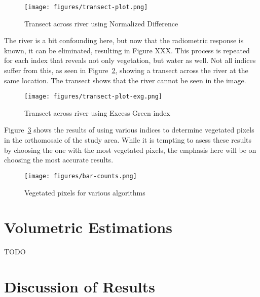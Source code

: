 \documentclass[letterpaper]{article}
\begin{document}
{\begin{figure}[H]
\centering
  	\texttt{[image: figures/transect-plot.png]}
  	\label{fig:exgexr}
  \caption{Transect across river using Normalized Difference}
    \label{fig:transect-plot} 
\end{figure}

The river is a bit confounding here, but now that the radiometric response is known, it can be eliminated, resulting in Figure XXX.  This process is repeated for each index that reveals not only vegetation, but water as well. Not all indices suffer from this, as seen in Figure~\ref{fig:transect-plot-exg}, showing a transect across the river at the same location.  The transect shows that the river cannot be seen in the image.

\begin{figure}[H]
\centering
  \texttt{[image: figures/transect-plot-exg.png]}
  \caption{Transect across river using Excess Green index}
  \label{fig:transect-plot-exg} 
\end{figure}

Figure~\ref{fig:barcount} shows the results of using various indices to determine vegetated pixels in the orthomosaic of the study area.  While it is tempting to asess these results by choosing the one with the most vegetated pixels, the emphasis here will be on choosing the most accurate results.

\begin{figure}[H]
\centering
  	\texttt{[image: figures/bar-counts.png]}
  	 \caption{Vegetated pixels for various algorithms}
  	\label{fig:barcount}
\end{figure}

\section{Volumetric Estimations}
TODO

%
%
\section{Discussion of Results}


}
\end{document}
